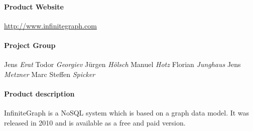 
\paragraph{Product Website} \url{http://www.infinitegraph.com}

\paragraph{Project Group}
Jens \textit{Erat}
Todor \textit{Georgiev}
J\"{u}rgen \textit{H\"{o}lsch}
Manuel \textit{Hotz}
Florian \textit{Junghaus}
Jens \textit{Metzner}
Marc Steffen \textit{Spicker}

\paragraph{Product description} 
InfiniteGraph is a NoSQL system which is based on a graph data model. It was released in 2010 and is available as a free and paid version.